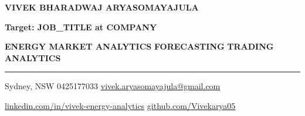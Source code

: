 \documentclass[10pt,a4paper]{article}
\begin{document}
\RaggedRight


\begin{tcolorbox}[
colback=Primary,
colframe=Primary,
arc=6pt,
boxrule=0pt,
left=16pt,
right=16pt,
top=14pt,
bottom=12pt
]

\begin{center}

{\fontsize{18}{20}\selectfont
\textbf{\color{white} VIVEK BHARADWAJ ARYASOMAYAJULA}
}

\vspace{8pt}

{\small
\textbf{\color{white} Target: {{JOB_TITLE}} at {{COMPANY}}}
}

\vspace{8pt}

{\normalsize
\textbf{\color{Accent} ENERGY MARKET ANALYTICS}
\hspace{8pt}
{\color{white}\textbar}
\hspace{8pt}
\textbf{\color{Accent} FORECASTING}
\hspace{8pt}
{\color{white}\textbar}
\hspace{8pt}
\textbf{\color{Accent} TRADING ANALYTICS}
}

\vspace{10pt}

{\color{Accent}\rule{0.88\linewidth}{0.4pt}}

\vspace{10pt}

{\small\color{white}
Sydney, NSW
\hspace{10pt}
{\color{Accent}\textbar}
\hspace{10pt}
0425177033
\hspace{10pt}
{\color{Accent}\textbar}
\hspace{10pt}
\href{mailto:vivek.aryasomayajula@gmail.com}
{\color{white}vivek.aryasomayajula@gmail.com}
}

\vspace{6pt}

{\small\color{white}
\href{https://www.linkedin.com/in/vivek-energy-analytics}
{\color{white}linkedin.com/in/vivek-energy-analytics}
\hspace{10pt}
{\color{Accent}\textbar}
\hspace{10pt}
\href{https://github.com/Vivekarya05}
{\color{white}github.com/Vivekarya05}
}

\end{center}

\end{tcolorbox}
\end{document}
